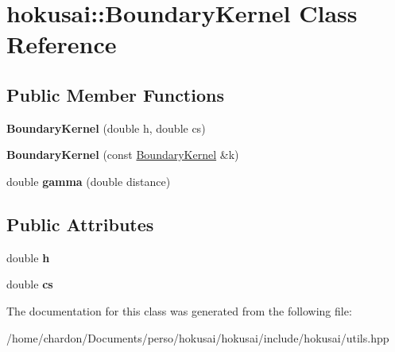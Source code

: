 \hypertarget{classhokusai_1_1BoundaryKernel}{\section{hokusai\+:\+:Boundary\+Kernel Class Reference}
\label{classhokusai_1_1BoundaryKernel}
}
\subsection*{Public Member Functions}
\begin{DoxyCompactItemize}
\item 
\hypertarget{classhokusai_1_1BoundaryKernel_ae423bed7225301bd72dfa4c42c70affa}{{\bfseries Boundary\+Kernel} (double h, double cs)}\label{classhokusai_1_1BoundaryKernel_ae423bed7225301bd72dfa4c42c70affa}

\item 
\hypertarget{classhokusai_1_1BoundaryKernel_aa560098bf5cec34ad0eafec17ecd7e70}{{\bfseries Boundary\+Kernel} (const \hyperlink{classhokusai_1_1BoundaryKernel}{Boundary\+Kernel} \&k)}\label{classhokusai_1_1BoundaryKernel_aa560098bf5cec34ad0eafec17ecd7e70}

\item 
\hypertarget{classhokusai_1_1BoundaryKernel_a97839cac7277823ca9337ec4893dff24}{double {\bfseries gamma} (double distance)}\label{classhokusai_1_1BoundaryKernel_a97839cac7277823ca9337ec4893dff24}

\end{DoxyCompactItemize}
\subsection*{Public Attributes}
\begin{DoxyCompactItemize}
\item 
\hypertarget{classhokusai_1_1BoundaryKernel_ae8eb84b7b9751631223f0f24a3a680d7}{double {\bfseries h}}\label{classhokusai_1_1BoundaryKernel_ae8eb84b7b9751631223f0f24a3a680d7}

\item 
\hypertarget{classhokusai_1_1BoundaryKernel_abe3534ff94588e7cdb19f0fb0e935317}{double {\bfseries cs}}\label{classhokusai_1_1BoundaryKernel_abe3534ff94588e7cdb19f0fb0e935317}

\end{DoxyCompactItemize}


The documentation for this class was generated from the following file\+:\begin{DoxyCompactItemize}
\item 
/home/chardon/\+Documents/perso/hokusai/hokusai/include/hokusai/utils.\+hpp\end{DoxyCompactItemize}
